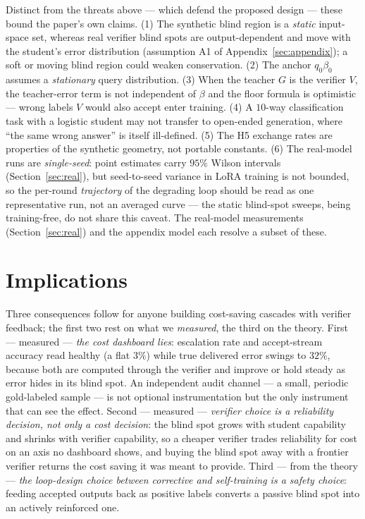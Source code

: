 \documentclass[11pt]{article}
\begin{document}
Distinct from the threats above --- which defend the proposed design ---
these bound the paper's own claims. (1) The synthetic blind region is a
\emph{static} input-space set, whereas real verifier blind spots are
output-dependent and move with the student's error distribution
(assumption A1 of Appendix~\ref{sec:appendix}); a soft or moving blind
region could weaken conservation. (2) The anchor \(q_{0}\beta_{0}\)
assumes a \emph{stationary} query distribution. (3) When the teacher
\(G\) is the verifier \(V\), the teacher-error term is not independent
of \(\beta\) and the floor formula is optimistic --- wrong labels \(V\)
would also accept enter training. (4) A \(10\)-way classification task
with a logistic student may not transfer to open-ended generation, where
``the same wrong answer'' is itself ill-defined. (5) The H5 exchange
rates are properties of the synthetic geometry, not portable constants.
(6) The real-model runs are \emph{single-seed}: point estimates carry
\(95\%\) Wilson intervals (Section~\ref{sec:real}), but seed-to-seed
variance in LoRA training is not bounded, so the per-round
\emph{trajectory} of the degrading loop should be read as one
representative run, not an averaged curve --- the static blind-spot
sweeps, being training-free, do not share this caveat. The real-model
measurements (Section~\ref{sec:real}) and the appendix model each resolve
a subset of these.

\section{Implications}

Three consequences follow for anyone building cost-saving cascades with
verifier feedback; the first two rest on what we \emph{measured}, the
third on the theory. First --- measured --- \emph{the cost dashboard
lies}: escalation rate and accept-stream accuracy read healthy (a flat
\(3\%\)) while true delivered error swings to \(32\%\), because both are
computed through the verifier and improve or hold steady as error hides
in its blind spot. An independent audit channel --- a small, periodic
gold-labeled sample --- is not optional instrumentation but the only
instrument that can see the effect. Second --- measured ---
\emph{verifier choice is a reliability decision, not only a cost
decision}: the blind spot grows with student capability and shrinks with
verifier capability, so a cheaper verifier trades reliability for cost
on an axis no dashboard shows, and buying the blind spot away with a
frontier verifier returns the cost saving it was meant to provide. Third
--- from the theory --- \emph{the loop-design choice between corrective
and self-training is a safety choice}: feeding accepted outputs back as
positive labels converts a passive blind spot into an actively
reinforced one.
\end{document}
